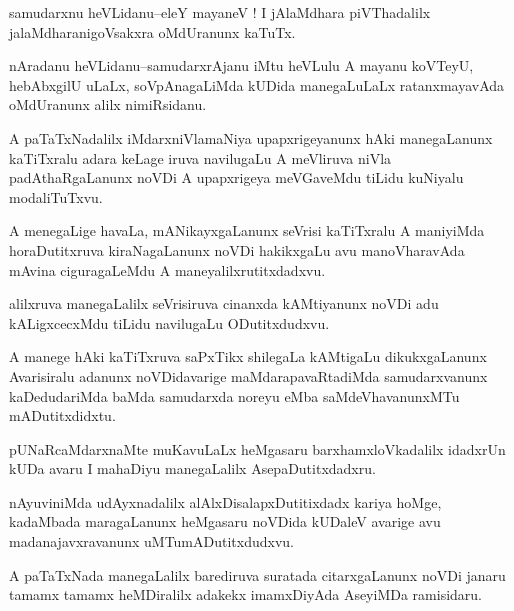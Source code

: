 \documentclass{article}
\begin{document}
\begin{mn}%
samudarxnu heVLidanu--eleY mayaneV ! I jAlaMdhara piVThadalilx jalaMdharanigoVsakxra 
oMdUranunx kaTuTx.
\end{mn}

\begin{mn}%
nAradanu heVLidanu--samudarxrAjanu iMtu heVLulu A mayanu koVTeyU, hebAbxgilU uLaLx, 
soVpAnagaLiMda kUDida manegaLuLaLx ratanxmayavAda oMdUranunx alilx nimiRsidanu.
\end{mn}

\begin{mn}%
A paTaTxNadalilx iMdarxniVlamaNiya upapxrigeyanunx hAki manegaLanunx kaTiTxralu adara keLage 
iruva navilugaLu A meVliruva niVla padAthaRgaLanunx noVDi A upapxrigeya meVGaveMdu tiLidu 
kuNiyalu modaliTuTxvu.
\end{mn}

\begin{mn}%
A menegaLige havaLa, mANikayxgaLanunx seVrisi kaTiTxralu A maniyiMda horaDutitxruva 
kiraNagaLanunx noVDi hakikxgaLu avu manoVharavAda mAvina ciguragaLeMdu A 
maneyalilxrutitxdadxvu.
\end{mn}

\begin{mn}%
alilxruva manegaLalilx seVrisiruva cinanxda kAMtiyanunx noVDi adu kALigxcecxMdu tiLidu 
navilugaLu ODutitxdudxvu.
\end{mn}

\begin{mn}%
A manege hAki kaTiTxruva saPxTikx shilegaLa kAMtigaLu dikukxgaLanunx Avarisiralu adanunx 
noVDidavarige maMdarapavaRtadiMda samudarxvanunx kaDedudariMda baMda samudarxda noreyu eMba 
saMdeVhavanunxMTu mADutitxdidxtu.
\end{mn}

\begin{mn}%
pUNaRcaMdarxnaMte muKavuLaLx heMgasaru barxhamxloVkadalilx idadxrUn kUDa avaru I mahaDiyu 
manegaLalilx AsepaDutitxdadxru.
\end{mn}

\begin{mn}%
nAyuviniMda udAyxnadalilx alAlxDisalapxDutitixdadx kariya hoMge, kadaMbada maragaLanunx 
heMgasaru noVDida kUDaleV avarige avu madanajavxravanunx uMTumADutitxdudxvu.
\end{mn}

\begin{mn}%
A paTaTxNada manegaLalilx barediruva suratada citarxgaLanunx noVDi janaru tamamx tamamx 
heMDiralilx adakekx imamxDiyAda AseyiMDa ramisidaru.
\end{mn}
\end{document}
